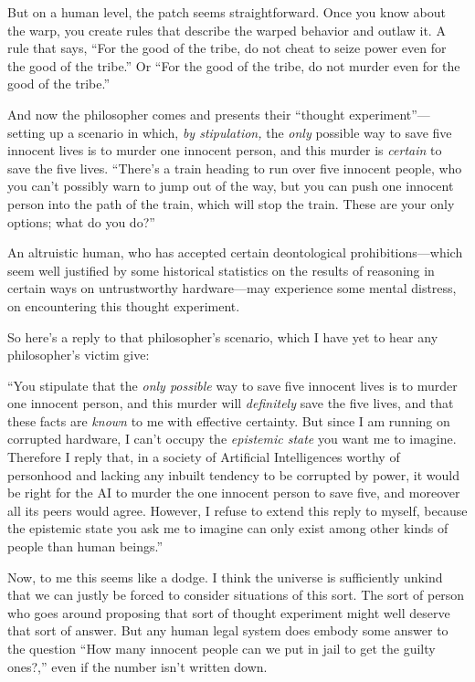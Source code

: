 {
 But on a human level, the patch seems straightforward. Once you
know about the warp, you create rules that describe the warped behavior
and outlaw it. A rule that says, ``For the good of the
tribe, do not cheat to seize power even for the good of the
tribe.'' Or ``For the good of the
tribe, do not murder even for the good of the
tribe.''}

{
 And now the philosopher comes and presents their
``thought experiment''---setting up
a scenario in which, \textit{by stipulation,} the \textit{only}
possible way to save five innocent lives is to murder one innocent
person, and this murder is \textit{certain} to save the five lives.
``There's a train heading to run over
five innocent people, who you can't possibly warn to
jump out of the way, but you can push one innocent person into the path
of the train, which will stop the train. These are your only options;
what do you do?''}

{
 An altruistic human, who has accepted certain deontological
prohibitions---which seem well justified by some historical statistics
on the results of reasoning in certain ways on untrustworthy
hardware---may experience some mental distress, on encountering this
thought experiment.}

{
 So here's a reply to that
philosopher's scenario, which I have yet to hear any
philosopher's victim give:}

{
 ``You stipulate that the \textit{only possible}
way to save five innocent lives is to murder one innocent person, and
this murder will \textit{definitely} save the five lives, and that
these facts are \textit{known} to me with effective certainty. But
since I am running on corrupted hardware, I can't
occupy the \textit{epistemic state} you want me to imagine. Therefore I
reply that, in a society of Artificial Intelligences worthy of
personhood and lacking any inbuilt tendency to be corrupted by power,
it would be right for the AI to murder the one innocent person to save
five, and moreover all its peers would agree. However, I refuse to
extend this reply to myself, because the epistemic state you ask me to
imagine can only exist among other kinds of people than human
beings.''}

{
 Now, to me this seems like a dodge. I think the universe is
sufficiently unkind that we can justly be forced to consider situations
of this sort. The sort of person who goes around proposing that sort of
thought experiment might well deserve that sort of answer. But any
human legal system does embody some answer to the question
``How many innocent people can we put in jail to get
the guilty ones?,'' even if the number
isn't written down.}

